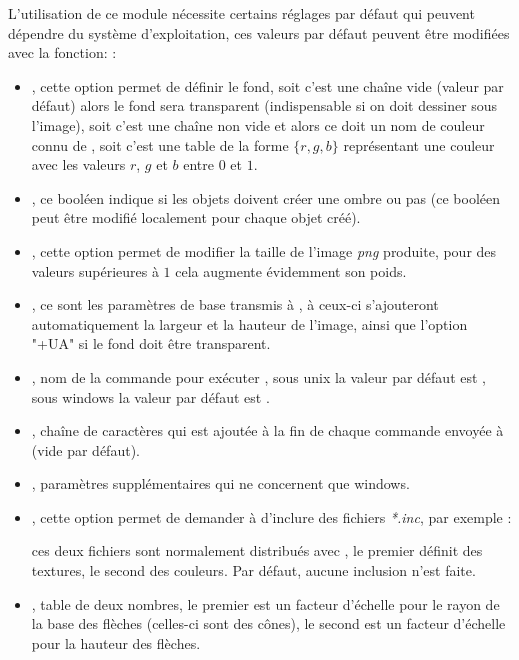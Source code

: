 L'utilisation de ce module nécessite certains réglages par défaut qui peuvent dépendre du système d'exploitation, ces valeurs par défaut peuvent être modifiées avec la fonction: 
\writeoptions :
\begin{itemize}
    \item {}, cette option permet de définir le fond, soit c'est une chaîne vide (valeur par défaut) alors le fond sera transparent (indispensable si on doit dessiner sous l'image), soit c'est une chaîne non vide et alors ce doit un nom de couleur connu de \povray, soit c'est une table de la forme $\{r,g,b\}$ représentant une couleur avec les valeurs $r$, $g$ et $b$ entre $0$ et $1$.
    
    \item {}, ce booléen indique si les objets doivent créer une ombre ou pas (ce booléen peut être modifié localement pour chaque objet créé).
    
    \item {}, cette option permet de modifier la taille de l'image \emph{png} produite, pour des valeurs supérieures à $1$ cela augmente évidemment son poids.
    
    \item {}, ce sont les paramètres de base transmis à \povray, à ceux-ci s'ajouteront automatiquement la largeur et la hauteur de l'image, ainsi que l'option "+UA" si le fond doit être transparent.
    
    \item {}, nom de la commande pour exécuter \povray, sous unix la valeur par défaut est , sous windows la valeur par défaut est .
    
    \item {}, chaîne de caractères qui est ajoutée à la fin de chaque commande envoyée à \povray (vide par défaut).
    
    \item {}, paramètres supplémentaires qui ne concernent que windows.
    
    \item {}, cette option permet de demander à \povray d'inclure des fichiers \emph{*.inc}, par exemple : \par
    \hfil{}\hfil\par ces deux fichiers sont normalement distribués avec \povray, le premier définit des textures, le second des couleurs. Par défaut, aucune inclusion n'est faite.
    
    \item {}, table de deux nombres, le premier est un facteur d'échelle pour le rayon de la base des flèches (celles-ci sont des cônes), le second est un facteur d'échelle pour la hauteur des flèches.
\end{itemize}


